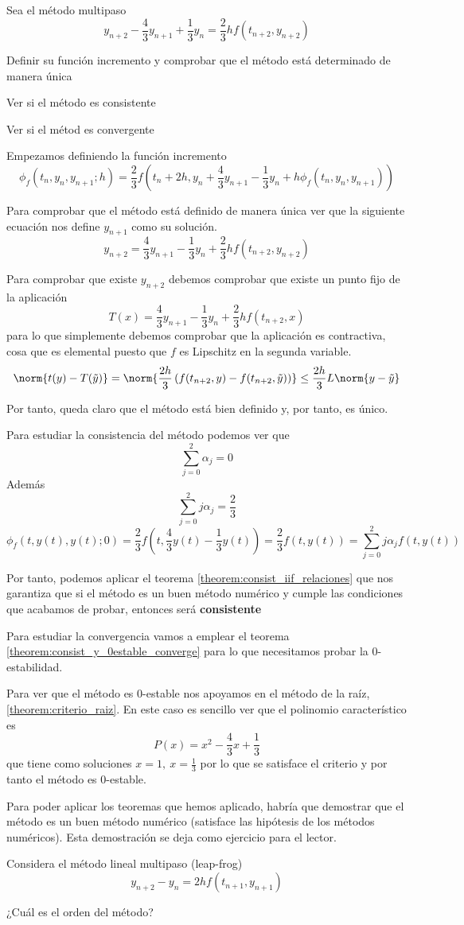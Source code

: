 \begin{problem}[5]
Sea el método multipaso
\[y_{n+2} - \frac{4}{3}y_{n+1}+\frac{1}{3}y_n = \frac{2}{3}hf(t_{n+2},y_{n+2})\]

\ppart Definir su función incremento y comprobar que el método está determinado de manera única

\ppart Ver si el método es consistente

\ppart Ver si el métod es convergente
\solution

\spart
Empezamos definiendo la función incremento
\[\phi_f(t_n,y_n,y_{n+1};h) = \frac{2}{3}f(t_n+2h,y_n+\frac{4}{3}y_{n+1}-\frac{1}{3}y_n+h\phi_f(t_n,y_n,y_{n+1}))\]


Para comprobar que el método está definido de manera única ver que la siguiente ecuación nos define $y_{n+1}$ como su solución.
\[y_{n+2} = \frac{4}{3}y_{n+1}-\frac{1}{3}y_n + \frac{2}{3}hf(t_{n+2},y_{n+2})\]

Para comprobar que existe $y_{n+2}$ debemos comprobar que existe un punto fijo de la aplicación 
\[T(x) =  \frac{4}{3}y_{n+1}-\frac{1}{3}y_n + \frac{2}{3}hf(t_{n+2},x)\]
para lo que simplemente debemos comprobar que la aplicación es contractiva, cosa que es elemental puesto que $f$ es Lipschitz en la segunda variable.
\[\norm{t(y)-T(\tilde{y})} = \norm{\frac{2h}{3} \left( f(t_{n+2},y) - f(t_{n+2},\tilde{y})\right)} \leq \frac{2h}{3}L\norm{y - \tilde{y}}\]

Por tanto, queda claro que el método está bien definido y, por tanto, es único.

\spart

Para estudiar la consistencia del método podemos ver que
\[\sum_{j=0}^2 α_j = 0\]
Además
\[\sum_{j=0}^2jα_j = \frac{2}{3}\]
\[\phi_f(t,y(t),y(t);0) = \frac{2}{3}f(t,\frac{4}{3}y(t)-\frac{1}{3}y(t)) = \frac{2}{3}f(t,y(t)) = \sum_{j=0}^2 jα_j f(t,y(t))\]

Por tanto, podemos aplicar el teorema \ref{theorem:consist_iif_relaciones} que nos garantiza que si el método es un buen método numérico y cumple las condiciones que acabamos de probar, entonces será \textbf{consistente}

\spart

Para estudiar la convergencia vamos a emplear el teorema \ref{theorem:consist_y_0estable_converge} para lo que necesitamos probar la 0-estabilidad.

Para ver que el método es 0-estable nos apoyamos en el método de la raíz, \ref{theorem:criterio_raiz}. En este caso es sencillo ver que el polinomio característico es
\[P(x)=x^2-\frac{4}{3}x+\frac{1}{3}\]
que tiene como soluciones $x=1, \ x=\frac{1}{3}$ por lo que se satisface el criterio y por tanto el método es 0-estable.

\obs Para poder aplicar los teoremas que hemos aplicado, habría que demostrar que el método es un buen método numérico (satisface las hipótesis de los métodos numéricos). Esta demostración se deja como ejercicio para el lector.

\end{problem}

\begin{problem}[6]
Considera el método lineal multipaso (leap-frog)
\[y_{n+2}-y_n = 2hf(t_{n+1},y_{n+1})\]

¿Cuál es el orden del método?
\solution
\end{problem}
